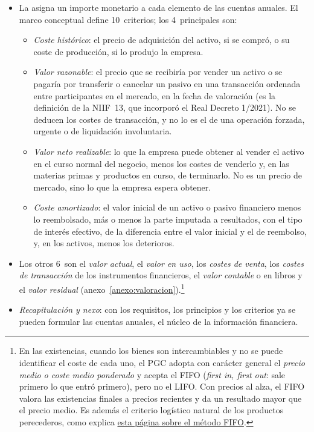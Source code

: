 \documentclass[11pt]{article}
\begin{document}
\begin{itemize}
\item La  asigna un importe monetario a cada elemento de las cuentas anuales. El marco conceptual define 10~criterios; los 4~principales son:
  \begin{itemize}
  \item \emph{Coste histórico}: el precio de adquisición del activo, si se compró, o su coste de producción, si lo produjo la empresa.
  \item \emph{Valor razonable}: el precio que se recibiría por vender un activo o se pagaría por transferir o cancelar un pasivo en una transacción ordenada entre participantes en el mercado, en la fecha de valoración (es la definición de la NIIF~13, que incorporó el Real Decreto 1/2021). No se deducen los costes de transacción, y no lo es el de una operación forzada, urgente o de liquidación involuntaria\nocite{BOE2021RD1}.
  \item \emph{Valor neto realizable}: lo que la empresa puede obtener al vender el activo en el curso normal del negocio, menos los costes de venderlo y, en las materias primas y productos en curso, de terminarlo. No es un precio de mercado, sino lo que la empresa espera obtener.
  \item \emph{Coste amortizado}: el valor inicial de un activo o pasivo financiero menos lo reembolsado, más o menos la parte imputada a resultados, con el tipo de interés efectivo, de la diferencia entre el valor inicial y el de reembolso, y, en los activos, menos los deterioros.
  \end{itemize}
\item Los otros 6~son el \emph{valor actual}, el \emph{valor en uso}, los \emph{costes de venta}, los \emph{costes de transacción} de los instrumentos financieros, el \emph{valor contable} o en libros y el \emph{valor residual} (anexo~\ref{anexo:valoracion}).\footnote{En las existencias, cuando los bienes son intercambiables y no se puede identificar el coste de cada uno, el PGC adopta con carácter general el \emph{precio medio o coste medio ponderado} y acepta el FIFO (\emph{first in, first out}: sale primero lo que entró primero), pero no el LIFO\nocite{BOE2007PGC}. Con precios al alza, el FIFO valora las existencias finales a precios recientes y da un resultado mayor que el precio medio. Es además el criterio logístico natural de los productos perecederos, como explica \href{http://web.archive.org/web/20230321133427/https://www.stocklogistic.com/metodo-fifo-valoracion-stock-almacen/}{esta página sobre el método FIFO}\nocite{Stocklogistic2023FIFO}.}
\item \emph{Recapitulación y nexo}: con los requisitos, los principios y los criterios ya se pueden formular las cuentas anuales, el núcleo de la información financiera.
\end{itemize}
\end{document}
